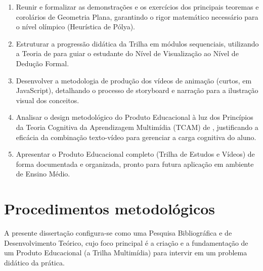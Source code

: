 \begin{enumerate}
    \item Reunir e formalizar as demonstrações e os exercícios dos principais teoremas e corolários de Geometria Plana, garantindo o rigor matemático necessário para o nível olímpico (Heurística de Pólya).
    
    \item Estruturar a progressão didática da Trilha em módulos sequenciais, utilizando a Teoria de  para guiar o estudante do Nível de Visualização ao Nível de Dedução Formal.
    
    \item Desenvolver a metodologia de produção dos vídeos de animação (curtos, em JavaScript), detalhando o processo de storyboard e narração para a ilustração visual dos conceitos.
    
    \item Analisar o design metodológico do Produto Educacional à luz dos Princípios da Teoria Cognitiva da Aprendizagem Multimídia (TCAM) de , justificando a eficácia da combinação texto-vídeo para gerenciar a carga cognitiva do aluno.
    
    \item Apresentar o Produto Educacional completo (Trilha de Estudos e Vídeos) de forma documentada e organizada, pronto para futura aplicação em ambiente de Ensino Médio.
\end{enumerate}

 
\section{Procedimentos metodológicos}
A presente dissertação configura-se como uma Pesquisa Bibliográfica e de Desenvolvimento Teórico, cujo foco principal é a criação e a fundamentação de um Produto Educacional (a Trilha Multimídia) para intervir em um problema didático da prática.

